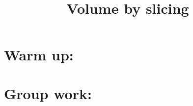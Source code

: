\documentclass[noinstructornotes]{ximera}
\title{Volume by slicing}
\begin{document}
\begin{abstract}		\end{abstract}
\maketitle



\section{Warm up:}

	\begin{freeResponse}
	
	\end{freeResponse}
	
\begin{instructorNotes}

\end{instructorNotes}







\section{Group work:}



\begin{problem}

	\begin{freeResponse}
	
	\end{freeResponse}
	
\end{problem}

\begin{instructorNotes}

\end{instructorNotes}







\begin{problem}

	\begin{freeResponse}
	
	\end{freeResponse}
		
\end{problem}
\end{document}
